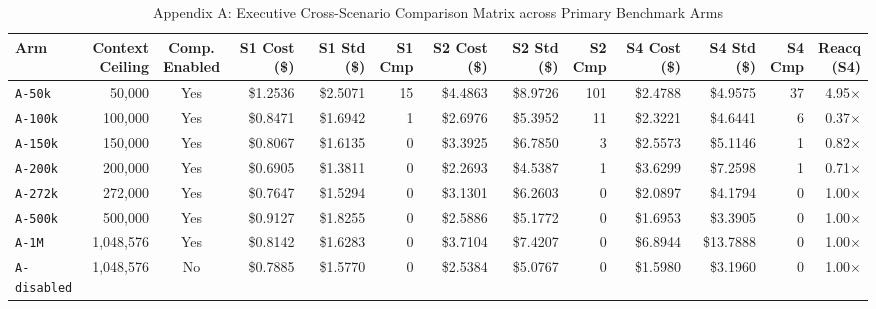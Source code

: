 \documentclass[10pt,twocolumn,a4paper]{article}
\begin{document}
\begin{table}[t]
\caption{Appendix A: Executive Cross-Scenario Comparison Matrix across Primary Benchmark Arms}
\label{tab:app_executive_matrix}
\centering
\scriptsize
\setlength{\tabcolsep}{2.5pt}
\begin{tabular}{@{}lrcrrrrrrrrrr@{}}
\toprule
\textbf{Arm} & \shortstack{\textbf{Context}\\\textbf{Ceiling}} & \shortstack{\textbf{Comp.}\\\textbf{Enabled}} & \shortstack{\textbf{S1 Cost}\\\textbf{(\$)}} & \shortstack{\textbf{S1 Std}\\\textbf{(\$)}} & \shortstack{\textbf{S1}\\\textbf{Cmp}} & \shortstack{\textbf{S2 Cost}\\\textbf{(\$)}} & \shortstack{\textbf{S2 Std}\\\textbf{(\$)}} & \shortstack{\textbf{S2}\\\textbf{Cmp}} & \shortstack{\textbf{S4 Cost}\\\textbf{(\$)}} & \shortstack{\textbf{S4 Std}\\\textbf{(\$)}} & \shortstack{\textbf{S4}\\\textbf{Cmp}} & \shortstack{\textbf{Reacq}\\\textbf{(S4)}} \\
\midrule
\texttt{A-50k} & 50,000 & Yes & \$1.2536 & \$2.5071 & 15 & \$4.4863 & \$8.9726 & 101 & \$2.4788 & \$4.9575 & 37 & 4.95$\times$ \\
\texttt{A-100k} & 100,000 & Yes & \$0.8471 & \$1.6942 & 1 & \$2.6976 & \$5.3952 & 11 & \$2.3221 & \$4.6441 & 6 & 0.37$\times$ \\
\texttt{A-150k} & 150,000 & Yes & \$0.8067 & \$1.6135 & 0 & \$3.3925 & \$6.7850 & 3 & \$2.5573 & \$5.1146 & 1 & 0.82$\times$ \\
\texttt{A-200k} & 200,000 & Yes & \$0.6905 & \$1.3811 & 0 & \$2.2693 & \$4.5387 & 1 & \$3.6299 & \$7.2598 & 1 & 0.71$\times$ \\
\texttt{A-272k} & 272,000 & Yes & \$0.7647 & \$1.5294 & 0 & \$3.1301 & \$6.2603 & 0 & \$2.0897 & \$4.1794 & 0 & 1.00$\times$ \\
\texttt{A-500k} & 500,000 & Yes & \$0.9127 & \$1.8255 & 0 & \$2.5886 & \$5.1772 & 0 & \$1.6953 & \$3.3905 & 0 & 1.00$\times$ \\
\texttt{A-1M} & 1,048,576 & Yes & \$0.8142 & \$1.6283 & 0 & \$3.7104 & \$7.4207 & 0 & \$6.8944 & \$13.7888 & 0 & 1.00$\times$ \\
\texttt{A-disabled} & 1,048,576 & No & \$0.7885 & \$1.5770 & 0 & \$2.5384 & \$5.0767 & 0 & \$1.5980 & \$3.1960 & 0 & 1.00$\times$ \\
\bottomrule
\end{tabular}
\end{table}
\end{document}
